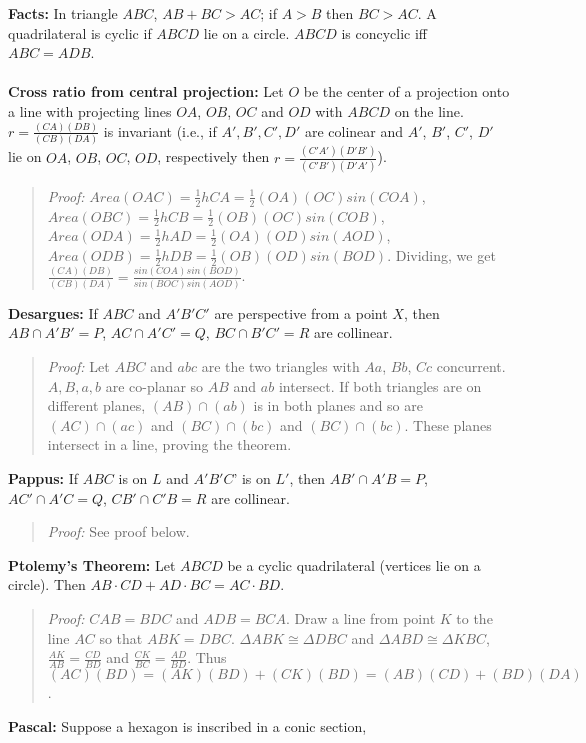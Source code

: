 {\bf Facts:}
In triangle $ABC$, $AB + BC > AC$; if $A > B$ then $BC > AC$.  A quadrilateral
is cyclic if $ABCD$ lie on a circle. $ABCD$ is concyclic iff $ABC=ADB$.
\\
\\
{\bf Cross ratio from central projection:} Let $O$ be the center 
of a projection onto
a line with projecting lines $OA$, $OB$, $OC$ and $OD$ with $ABCD$ on the line. $r=
{\frac {(CA)(DB)} {(CB)(DA)}}$ is invariant (i.e., if $A', B', C', D'$ are colinear and
$A'$, $B'$, $C'$, $D'$ lie on $OA$, $OB$, $OC$, $OD$, respectively then
$r= {\frac {(C'A')(D'B')} {(C'B')(D'A')}}$).
\begin{quote}
\emph{Proof:} 
$Area(OAC) = {\frac {1} {2}} h CA = {\frac 1 2} (OA)(OC)sin(COA)$,
$Area(OBC) = {\frac {1} {2}} h CB = {\frac 1 2} (OB)(OC)sin(COB)$,
$Area(ODA) = {\frac {1} {2}} h AD = {\frac 1 2} (OA)(OD)sin(AOD)$,
$Area(ODB) = {\frac {1} {2}} h DB = {\frac 1 2} (OB)(OD)sin(BOD)$.
Dividing, we get
${\frac {(CA)(DB)} {(CB)(DA)}} = {\frac {sin(COA) sin(BOD)} {sin(BOC) sin(AOD)}}$.
\end{quote}
{\bf Desargues:} If $ABC$ and $A'B'C'$ are perspective from a point $X$, then
$AB \cap A'B' = P$, $AC \cap A'C' = Q$, $BC \cap B'C' = R$
are collinear.
\begin{quote}
\emph{Proof:}
Let $ABC$ and $abc$ are the two triangles with $Aa$, $Bb$, $Cc$ concurrent.
$A, B, a, b$ are co-planar so $AB$ and $ab$ intersect.  If both triangles
are on different planes, $(AB) \cap (ab)$ is in both planes and so are
$(AC) \cap (ac)$ and $(BC) \cap (bc)$  and $(BC) \cap (bc)$.  These planes
intersect in a line, proving the theorem.
\end{quote}
{\bf Pappus:} If $ABC$ is on $L$ and $A'B'C$' is on $L'$, then
$AB' \cap A'B = P$, $AC' \cap A'C = Q$, $CB' \cap C'B = R$ are collinear. 
\begin{quote}
\emph{Proof:} See proof below.
\end{quote}
{\bf Ptolemy's Theorem:} Let $ABCD$ be a cyclic quadrilateral (vertices lie
on a circle).  Then $AB \cdot CD + AD \cdot BC = AC \cdot BD$.
\begin{quote}
\emph{Proof:}
$CAB = BDC$ and $ADB = BCA$.  Draw a line from point $K$ to the line $AC$ so that $ABK = DBC$.
$\Delta ABK \cong \Delta DBC$ and $\Delta ABD \cong \Delta KBC$,
${\frac {AK} {AB}} = {\frac {CD} {BD}}$ and ${\frac {CK} {BC}} = {\frac {AD} {BD}}$.
Thus $(AC)(BD) = (AK)(BD) +(CK)(BD) = (AB)(CD) + (BD)(DA)$.
\end{quote}
{\bf Pascal:}
Suppose a hexagon is inscribed in a conic section,  
